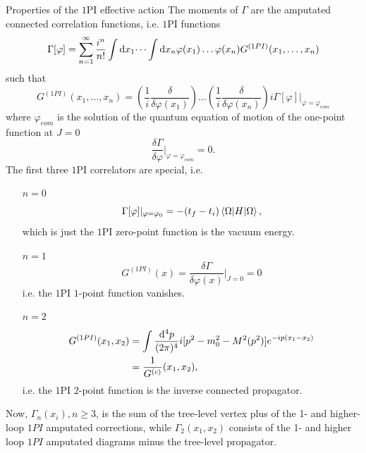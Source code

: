 	\begin{mybox}{Properties of the $1$PI effective action}
	The moments of $\Gamma$ are the amputated connected correlation functions, i.e. $1$PI functions
	\begin{equation}
		\Gamma[\varphi] = \sum_{n=1}^{\infty} \frac{i^n}{n!}\int \mathrm{d} x_1 \dots \int \mathrm{d} x_n \varphi(x_1) \dots \varphi(x_n) G^{(1PI)}(x_1,\dots,x_n)
	\end{equation}
	such that
	\begin{equation}
	\label{eq:onePINpointcumulant}
		G^{(1PI)} (x_1,\dots,x_n) = \left(\frac{1}{i} \frac{\delta}{\delta \varphi(x_1)}\right)\dots \left(\frac{1}{i} \frac{\delta}{\delta \varphi(x_n)}\right) i \Gamma[\varphi]|_{\varphi=\varphi_{eom}}
	\end{equation}
	where $\varphi_{eom}$ is the solution of the quantum equation of motion of the one-point function at $J=0$
	\begin{equation}
	\label{eq:quantumeomOnepointfunction}
		\frac{\delta \Gamma}{\delta \varphi} |_{\varphi=\varphi_{eom}} =0.
	\end{equation}
	The first three $1$PI correlators are special, i.e.
	\begin{enumerate}
		\item[$n=0$] 
			\begin{equation}
			\label{eq:onePIzeropointfunction}
		\Gamma[\varphi] |_{\varphi=\varphi_0} = - (t_f-t_i) \expval{H}{\Omega} ,
		\end{equation}
		which is  just the $1$PI zero-point function is the vacuum energy.
		\item[$n=1$] 
		\begin{equation}
		\label{eq:onePIoneppointfunction}
		G^{(1PI)}(x) = \frac{\delta \Gamma}{\delta \varphi(x)} |_{J=0} = 0
		\end{equation}
		i.e. the $1$PI $1$-point function vanishes.
		\item[$n=2$]
		\begin{align}
			\label{eq:onePItwopointfunction}
		G^{(1PI)}(x_1,x_2) &= \int \frac{\mathrm{d}^4 p}{(2\pi)^4} i [p^2-m^2_0-M^2(p^2)] e^{-ip(x_1-x_2)} \\
		&= \frac{1}{G^{(c)}}(x_1,x_2),
	\end{align}
	i.e. the $1$PI $2$-point function is the inverse connected propagator.
\end{enumerate}	
\end{mybox}
 Now, $\Gamma_n(x_i), n\geq 3$, is the sum of the tree-level vertex plus of the 1- and higher-loop $1PI$ amputated corrections, while $\Gamma_2(x_1,x_2)$ consists of the 1- and higher loop $1PI$ amputated diagrams minus the tree-level propagator.\\
